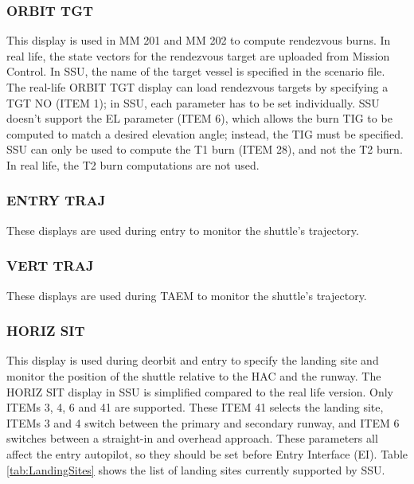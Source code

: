 \documentclass[Space_Shuttle_Ultra_Manual.tex]{subfiles}
\begin{document}
\begin{multicols*}{2}
\subsubsection{ORBIT TGT}
This display is used in MM 201 and MM 202 to compute rendezvous burns. In real life, the state vectors for the rendezvous target are uploaded from Mission Control. In SSU, the name of the target vessel is specified in the scenario file.
The real-life ORBIT TGT display can load rendezvous targets by specifying a TGT NO (ITEM 1); in SSU, each parameter has to be set individually. SSU doesn't support the EL parameter (ITEM 6), which allows the burn TIG to be computed to match a desired elevation angle; instead, the TIG must be specified.
SSU can only be used to compute the T1 burn (ITEM 28), and not the T2 burn. In real life, the T2 burn computations are not used.

\subsubsection{ENTRY TRAJ}
These displays are used during entry to monitor the shuttle's trajectory.

\subsubsection{VERT TRAJ}
These displays are used during TAEM to monitor the shuttle's trajectory.

\subsubsection{HORIZ SIT}
This display is used during deorbit and entry to specify the landing site and monitor the position of the shuttle relative to the HAC and the runway.
The HORIZ SIT display in SSU is simplified compared to the real life version. Only ITEMs 3, 4, 6 and 41 are supported. These ITEM 41 selects the landing site, ITEMs 3 and 4 switch between the primary and secondary runway, and ITEM 6 switches between a straight-in and overhead approach. These parameters all affect the entry autopilot, so they should be set before Entry Interface (EI).
Table \ref{tab:LandingSites} shows the list of landing sites currently supported by SSU.


\end{multicols*}
\end{document}
